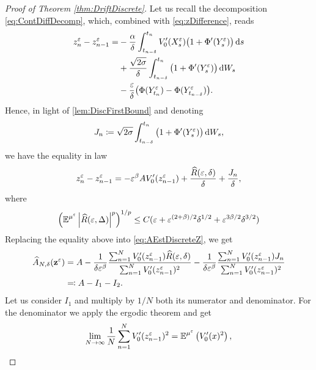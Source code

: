 \documentclass[10pt]{article}
\begin{document}
\begin{proof}[Proof of Theorem \ref{thm:DriftDiscrete}]  Let us recall the decomposition \eqref{eq:ContDiffDecomp}, which, combined with \eqref{eq:zDifference}, reads
	\begin{equation}
	\begin{aligned}
		z^\varepsilon_n - z^\varepsilon_{n-1} = &- \frac{\alpha}{\delta}\int_{t_{n-\delta}}^{t_n} V_0'(X^\varepsilon_s)\big(1 + \Phi'(Y^\varepsilon_s)\big)\,\mathrm{d} s \\
		&+\frac{\sqrt{2\sigma}}{\delta}\int_{t_{n-\delta}}^{t_n} \big(1 + \Phi'(Y^\varepsilon_s)\big) \,\mathrm{d} W_s \\
		&-\frac{\varepsilon}{\delta} \big(\Phi(Y^\varepsilon_{t_n})- \Phi(Y^\varepsilon_{t_{n-\delta}})\big).
	\end{aligned}
	\end{equation}
	Hence, in light of \ref{lem:DiscFirstBound} and denoting 
	\begin{equation}
		J_n \coloneqq \sqrt{2\sigma}\int_{t_{n-\delta}}^{t_n} \big(1 + \Phi'(Y^\varepsilon_s)\big) \,\mathrm{d} W_s,
	\end{equation}
	we have the equality in law
	\begin{equation}
		z^\varepsilon_n - z^\varepsilon_{n-1} = -\varepsilon^\beta A V_0'(z^\varepsilon_{n-1}) + \frac{\widehat R(\varepsilon, \delta)}{\delta} + \frac{J_n}{\delta},
	\end{equation}
	where
	\begin{equation}
		\left(\operatorname{\mathbb{E}}^{\mu^\varepsilon} \left\lvert\widehat R(\varepsilon, \Delta)\right\rvert^p\right)^{1/p} \leq C(\varepsilon +  \varepsilon^{(2+\beta)/2}\delta^{1/2} + \varepsilon^{3\beta/2}\delta^{3/2})
	\end{equation}
	Replacing the equality above into \eqref{eq:AEstDiscreteZ}, we get
	\begin{equation}
	\begin{aligned}
		\widehat A_{N, \delta}(\mathbf z^\varepsilon) &= A -\frac{1}{\delta \varepsilon^\beta}\frac{\sum_{n=1}^{N}V_0'(z^\varepsilon_{n-1})\widehat R(\varepsilon, \delta)}{\sum_{n=1}^{N} V_0'(z^\varepsilon_{n-1})^2} - \frac{1}{\delta \varepsilon^\beta}\frac{\sum_{n=1}^{N}V_0'(z^\varepsilon_{n-1})J_n}{\sum_{n=1}^{N} V_0'(z^\varepsilon_{n-1})^2} \\
		&\eqqcolon A - I_1 - I_2.
	\end{aligned}
	\end{equation}
	Let us consider $I_1$ and multiply by $1/N$ both its numerator and denominator. For the denominator we apply the ergodic theorem and get
	\begin{equation}
		\lim_{N \to \infty} \frac1N \sum_{n=1}^{N} V_0'(z^\varepsilon_{n-1})^2 = \operatorname{\mathbb{E}}^{\mu^\varepsilon} \left(V_0'(x)^2\right),
	\end{equation}

\end{proof}
\end{document}
